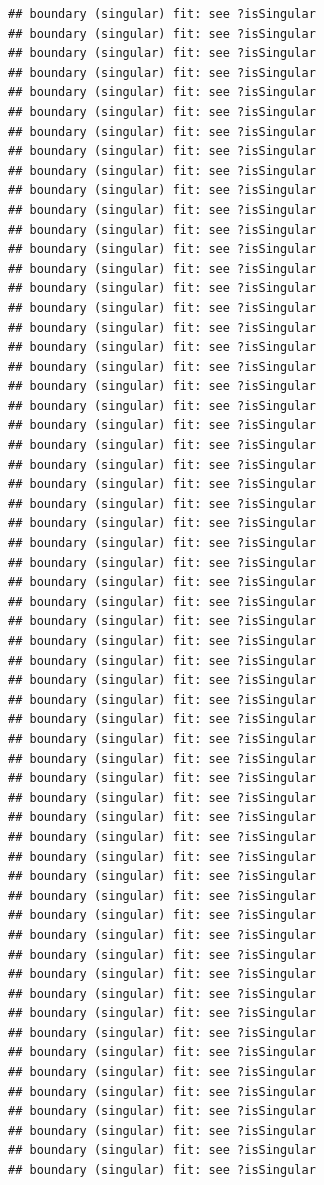 \documentclass[
]{article}
\begin{document}
\begin{verbatim}
## boundary (singular) fit: see ?isSingular
## boundary (singular) fit: see ?isSingular
## boundary (singular) fit: see ?isSingular
## boundary (singular) fit: see ?isSingular
## boundary (singular) fit: see ?isSingular
## boundary (singular) fit: see ?isSingular
## boundary (singular) fit: see ?isSingular
## boundary (singular) fit: see ?isSingular
## boundary (singular) fit: see ?isSingular
## boundary (singular) fit: see ?isSingular
## boundary (singular) fit: see ?isSingular
## boundary (singular) fit: see ?isSingular
## boundary (singular) fit: see ?isSingular
## boundary (singular) fit: see ?isSingular
## boundary (singular) fit: see ?isSingular
## boundary (singular) fit: see ?isSingular
## boundary (singular) fit: see ?isSingular
## boundary (singular) fit: see ?isSingular
## boundary (singular) fit: see ?isSingular
## boundary (singular) fit: see ?isSingular
## boundary (singular) fit: see ?isSingular
## boundary (singular) fit: see ?isSingular
## boundary (singular) fit: see ?isSingular
## boundary (singular) fit: see ?isSingular
## boundary (singular) fit: see ?isSingular
## boundary (singular) fit: see ?isSingular
## boundary (singular) fit: see ?isSingular
## boundary (singular) fit: see ?isSingular
## boundary (singular) fit: see ?isSingular
## boundary (singular) fit: see ?isSingular
## boundary (singular) fit: see ?isSingular
## boundary (singular) fit: see ?isSingular
## boundary (singular) fit: see ?isSingular
## boundary (singular) fit: see ?isSingular
## boundary (singular) fit: see ?isSingular
## boundary (singular) fit: see ?isSingular
## boundary (singular) fit: see ?isSingular
## boundary (singular) fit: see ?isSingular
## boundary (singular) fit: see ?isSingular
## boundary (singular) fit: see ?isSingular
## boundary (singular) fit: see ?isSingular
## boundary (singular) fit: see ?isSingular
## boundary (singular) fit: see ?isSingular
## boundary (singular) fit: see ?isSingular
## boundary (singular) fit: see ?isSingular
## boundary (singular) fit: see ?isSingular
## boundary (singular) fit: see ?isSingular
## boundary (singular) fit: see ?isSingular
## boundary (singular) fit: see ?isSingular
## boundary (singular) fit: see ?isSingular
## boundary (singular) fit: see ?isSingular
## boundary (singular) fit: see ?isSingular
## boundary (singular) fit: see ?isSingular
## boundary (singular) fit: see ?isSingular
## boundary (singular) fit: see ?isSingular
## boundary (singular) fit: see ?isSingular
## boundary (singular) fit: see ?isSingular
## boundary (singular) fit: see ?isSingular
## boundary (singular) fit: see ?isSingular
## boundary (singular) fit: see ?isSingular

\end{verbatim}
\end{document}
